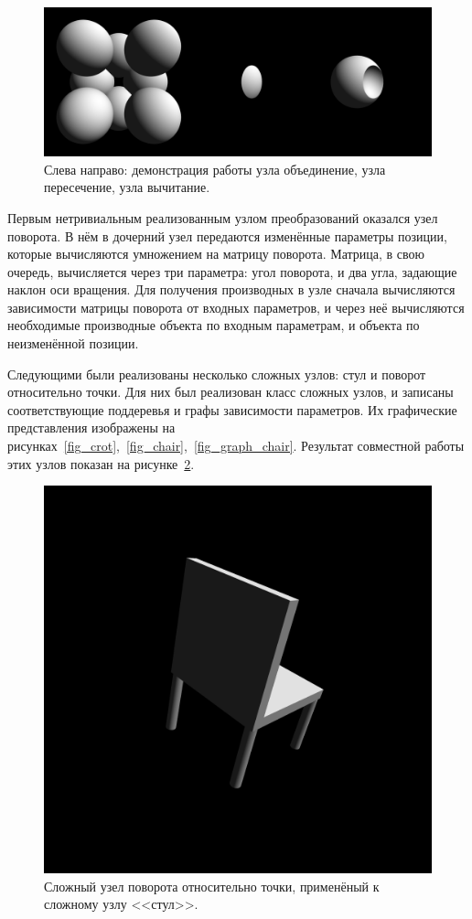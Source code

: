\documentclass[a4paper,hidelinks,12pt]{article}
\begin{document}
\begin{figure}[H]
\begin{center}
	\includegraphics[width=15 cm]{combine.png}
	\caption{Слева направо: демонстрация работы узла объединение, узла пересечение, узла вычитание.}
 	\label{fig_comb}
\end{center}
\end{figure}

\par
Первым нетривиальным реализованным узлом преобразований оказался узел поворота. В нём в дочерний узел передаются изменённые параметры позиции, которые вычисляются умножением на матрицу поворота. Матрица, в свою очередь, вычисляется через три параметра: угол поворота, и два угла, задающие наклон оси вращения. Для получения производных в узле сначала вычисляются зависимости матрицы поворота от входных параметров, и через неё вычисляются необходимые производные объекта по входным параметрам, и объекта по неизменённой позиции.
\par
Следующими были реализованы несколько сложных узлов: стул и поворот относительно точки. Для них был реализован класс сложных узлов, и записаны соответствующие поддеревья и графы зависимости параметров. Их графические представления изображены на рисунках~\ref{fig_crot},~\ref{fig_chair},~\ref{fig_graph_chair}. Результат совместной работы этих узлов показан на рисунке~\ref{fig_complex}.

\begin{figure}[H]
\begin{center}
	\includegraphics[width=5 cm]{complex_nodes.png}
	\caption{Сложный узел поворота относительно точки, применёный к сложному узлу <<стул>>.}
 	\label{fig_complex}
\end{center}
\end{figure}
\end{document}
